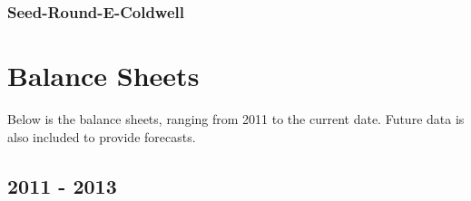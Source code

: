 \documentclass[letterpaper,10pt,english]{sphinxmanual}
\begin{document}
\subsection{Seed-Round-E-Coldwell}
\label{\detokenize{statements:seed-round-e-coldwell}}

\chapter{Balance Sheets}
\label{\detokenize{balancesheet2:balance-sheets}}\label{\detokenize{balancesheet2::doc}}
Below is the balance sheets, ranging from 2011 to the current date. Future data is also included to provide forecasts.


\section{2011 - 2013}
\label{\detokenize{balancesheet2:id1}}
\end{document}
